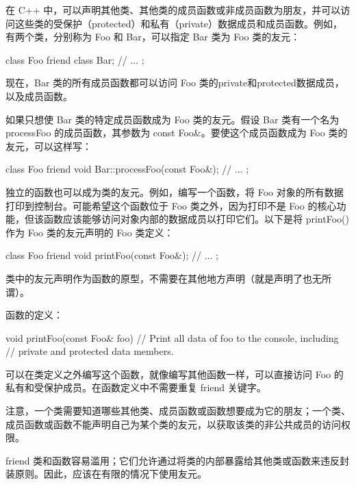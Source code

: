 在 C++ 中，可以声明其他类、其他类的成员函数或非成员函数为朋友，并可以访问这些类的受保护（protected）和私有（private）数据成员和成员函数。例如，有两个类，分别称为 Foo 和 Bar，可以指定 Bar 类为 Foo 类的友元：

\begin{cpp}
class Foo
{
    friend class Bar;
    // ...
};
\end{cpp}

现在，Bar 类的所有成员函数都可以访问 Foo 类的private和protected数据成员，以及成员函数。

如果只想使 Bar 类的特定成员函数成为 Foo 类的友元。假设 Bar 类有一个名为 processFoo 的成员函数，其参数为 const Foo\&。要使这个成员函数成为 Foo 类的友元，可以这样写：

\begin{cpp}
class Foo
{
    friend void Bar::processFoo(const Foo&);
    // ...
};
\end{cpp}

独立的函数也可以成为类的友元。例如，编写一个函数，将 Foo 对象的所有数据打印到控制台。可能希望这个函数位于 Foo 类之外，因为打印不是 Foo 的核心功能，但该函数应该能够访问对象内部的数据成员以打印它们。以下是将 printFoo() 作为 Foo 类的友元声明的 Foo 类定义：

\begin{cpp}
class Foo
{
    friend void printFoo(const Foo&);
    // ...
};
\end{cpp}

类中的友元声明作为函数的原型，不需要在其他地方声明（就是声明了也无所谓）。

函数的定义：

\begin{cpp}
void printFoo(const Foo& foo)
{
    // Print all data of foo to the console, including
    // private and protected data members.
}
\end{cpp}

可以在类定义之外编写这个函数，就像编写其他函数一样，可以直接访问 Foo 的私有和受保护成员。在函数定义中不需要重复 friend 关键字。

注意，一个类需要知道哪些其他类、成员函数或函数想要成为它的朋友；一个类、成员函数或函数不能声明自己为某个类的友元，以获取该类的非公共成员的访问权限。

friend 类和函数容易滥用；它们允许通过将类的内部暴露给其他类或函数来违反封装原则。因此，应该在有限的情况下使用友元。









